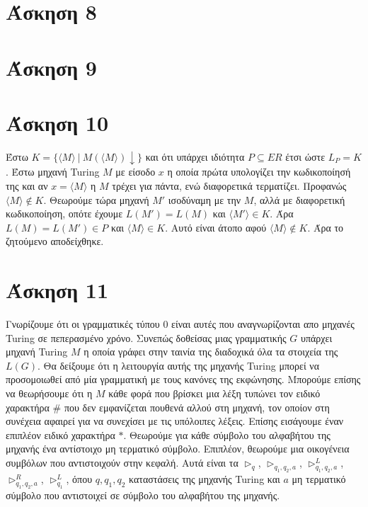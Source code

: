 \documentclass[a4paper, oneside, 11pt]{article}
\theoremstyle{definition}
\begin{document}
\section*{Άσκηση 8}
\section*{Άσκηση 9}
\section*{Άσκηση 10}
Έστω $K=\{\langle M\rangle\ |\ M(\langle M\rangle)\downarrow \}$ και ότι υπάρχει ιδιότητα $P\subseteq ER$ έτσι ώστε $L_P = K$. Έστω μηχανή Turing $Μ$ με είσοδο $x$
η οποία πρώτα υπολογίζει την κωδικοποίησή της και αν $x=\langle M\rangle$ η $M$ τρέχει για πάντα, ενώ διαφορετικά τερματίζει. Προφανώς $\langle M\rangle\notin K$.
Θεωρούμε τώρα μηχανή $M'$ ισοδύναμη με την $M$, αλλά με διαφορετική κωδικοποίηση, οπότε έχουμε $L(M')=L(M)$ και $\langle M'\rangle \in K$. 
Άρα $L(M)=L(M')\in P$ και $\langle M\rangle \in K$. 
Αυτό είναι
άτοπο αφού $\langle M\rangle\notin K$. Άρα το ζητούμενο αποδείχθηκε.

\section*{Άσκηση 11}
Γνωρίζουμε ότι οι γραμματικές τύπου $0$ είναι αυτές που αναγνωρίζονται απο μηχανές Turing σε πεπερασμένο χρόνο. Συνεπώς δοθείσας μιας γραμματικής $G$ υπάρχει μηχανή Turing
$M$ η οποία γράφει στην ταινία της διαδοχικά όλα τα στοιχεία της $L(G)$. Θα δείξουμε ότι η λειτουργία αυτής της μηχανής Turing μπορεί να προσομοιωθεί από μία γραμματική
με τους κανόνες της εκφώνησης. Μπορούμε επίσης να θεωρήσουμε ότι η $M$ κάθε φορά που βρίσκει μια λέξη τυπώνει τον ειδικό χαρακτήρα $\#$ που δεν εμφανίζεται πουθενά αλλού στη
μηχανή, τον οποίον στη συνέχεια αφαιρεί για να
συνεχίσει με τις υπόλοιπες λέξεις. Επίσης εισάγουμε έναν επιπλέον ειδικό χαρακτήρα $*$. 
Θεωρούμε για κάθε σύμβολο του αλφαβήτου της μηχανής ένα αντίστοιχο μη τερματικό σύμβολο. Επιπλέον, θεωρούμε μια οικογένεια συμβόλων που
αντιστοιχούν στην κεφαλή. Αυτά είναι τα $\triangleright_q$, $\triangleright_{q_1,q_2,a}$, $\triangleright_{q_1,q_2,a}^L$, $\triangleright_{q_1,q_2,a}^R$, $\triangleright_{q_1}^L$, όπου $q,q_1,q_2$
καταστάσεις της μηχανής Turing και $a$ μη τερματικό σύμβολο που αντιστοιχεί σε σύμβολο του αλφαβήτου της μηχανής.
\end{document}
